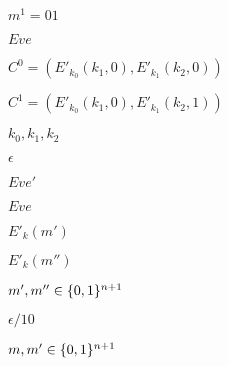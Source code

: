 \documentclass[10pt]{book}
\begin{document}
\begin{mdSnippets}
\begin{mdInlineSnippet}%
$m^1 = 01$\end{mdInlineSnippet}%
\begin{mdInlineSnippet}%
$Eve$\end{mdInlineSnippet}%
\begin{mdInlineSnippet}[57549138be1c142b8f4f433c9036f102]%
$C^0 = (E'_{k_0}(k_1,0),E'_{k_1}(k_2,0))$\end{mdInlineSnippet}%
\begin{mdInlineSnippet}[859eba2e187a39f5c1c7413d53e2c209]%
$C^1 = (E'_{k_0}(k_1,0),E'_{k_1}(k_2,1))$\end{mdInlineSnippet}%
\begin{mdInlineSnippet}[08d23c49ab9b985b0c3672033948c724]%
$k_0,k_1,k_2$\end{mdInlineSnippet}%
\begin{mdInlineSnippet}[92e4da341fe8f4cd46192f21b6ff3aa7]%
$\epsilon$\end{mdInlineSnippet}%
\begin{mdInlineSnippet}[0c3570ae86ed9d695d5d1d469a0b8bfa]%
$Eve'$\end{mdInlineSnippet}%
\begin{mdInlineSnippet}%
$Eve$\end{mdInlineSnippet}%
\begin{mdInlineSnippet}[ad5afc14e298b95279c15f4e4b6c1022]%
$E'_k(m')$\end{mdInlineSnippet}%
\begin{mdInlineSnippet}[e9ca51b645c921f374f3b8b5798e9e56]%
$E'_k(m'')$\end{mdInlineSnippet}%
\begin{mdInlineSnippet}[d2503c075bd47f548bbffc62c58ff8f1]%
$m',m''\in\{0,1\}^{n+1}$\end{mdInlineSnippet}%
\begin{mdInlineSnippet}[a18499b68e3b7c050e0a04741e013500]%
$\epsilon/10$\end{mdInlineSnippet}%
\begin{mdInlineSnippet}%
$m, m' \in \{0,1\} ^ {n+1}$\end{mdInlineSnippet}%

\end{mdSnippets}
\end{document}
